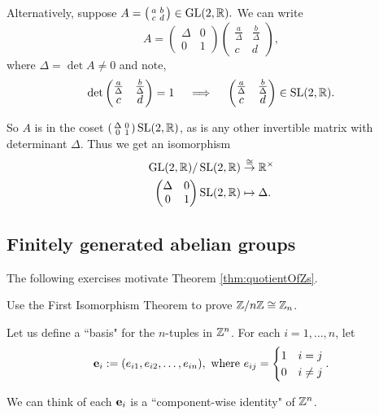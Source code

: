 \documentclass[../algebraNotesMSRI-UP2016.tex]{subfiles}
\begin{document}
\begin{frame}
Alternatively, suppose $A=\left(\begin{smallmatrix}
	a & b \\
	c & d
	\end{smallmatrix}\right)\in \operatorname{GL}(2,\mathbb R).$
We can write
\[
A=\begin{pmatrix}
	\Delta & 0 \\
	0 & 1 
	\end{pmatrix}
\begin{pmatrix}
\frac{a}{\Delta} & \frac{b}{\Delta} \\
c & d 
\end{pmatrix},
\]
where $\Delta=\det A\neq 0$ and note, 
\[
\det{\begin{pmatrix}
	\frac{a}{\Delta} & \frac{b}{\Delta} \\
	c & d 
	\end{pmatrix}
	}=1 
\quad\implies \quad 
\begin{pmatrix}
\frac{a}{\Delta} & \frac{b}{\Delta} \\
c & d 
\end{pmatrix} \in \operatorname{SL}(2,\mathbb R).
\]

\smallGap 
So $A$ is in the coset $\left(\begin{smallmatrix}
	\Delta & 0 \\
	0 & 1 
	\end{smallmatrix}\right)\operatorname{SL}(2,\mathbb R)$, as is any other invertible matrix with determinant $\Delta$.  Thus we get an isomorphism
\begin{align*}
\operatorname{GL}(2,\mathbb R)/\operatorname{SL}(2,\mathbb R) &\overset{\cong}{\to} \mathbb R^{\times} \\
\begin{pmatrix}
	\Delta & 0 \\
	0 & 1 
	\end{pmatrix}\operatorname{SL}(2,\mathbb R) &\mapsto \Delta.
\end{align*}		
\end{frame}

\subsection[\subsecname]{Finitely generated abelian groups}\label{subsec:FGAG}
\begin{frame}{\subsecname}{}
The following exercises motivate Theorem \ref{thm:quotientOfZs}.

\smallGap
\begin{exe}[cf. Problem 74]\label{exe:prob74}
Use the First Isomorphism Theorem to prove $\mathbb Z/n\mathbb Z\cong \mathbb Z_n$.
\end{exe}

\smallGap
Let us define a ``basis" for the $n$-tuples in $\mathbb Z^n$.  For each $i=1,\dots,n$, let 
\[
\mathbf e_i := (e_{i1},e_{i2},\dots,e_{in}), \text{ where }e_{ij}=\begin{cases}
	1 & i=j \\
	0 & i\neq j
	\end{cases}.
\]

\smallGap
We can think of each $\mathbf e_i$ is a ``component-wise identity" of $\mathbb Z^n$.
\end{frame}
\end{document}
